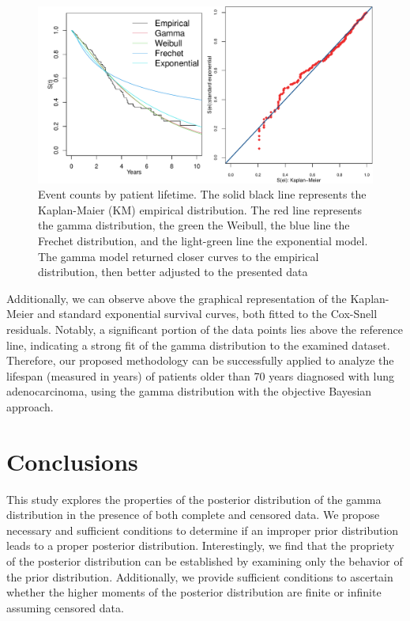 \documentclass[]{interact}
\theoremstyle{plain}%
\theoremstyle{definition}
\theoremstyle{remark}
\begin{document}
\begin{figure}[!h] 
	\centering
	\includegraphics[scale=0.50]{survival.pdf}
	\caption{Event counts by patient lifetime. The solid
black line represents the Kaplan-Maier (KM) empirical distribution. The red line
represents the gamma distribution, the green the Weibull, the blue line the Frechet distribution, and the light-green line the exponential model. The
gamma model returned closer curves to the empirical distribution, then better adjusted to the
presented data}\label{grafico-obscajust1}
\end{figure}

Additionally, we can observe above the graphical representation of the Kaplan-Meier and standard exponential survival curves, both fitted to the Cox-Snell residuals. Notably, a significant portion of the data points lies above the reference line, indicating a strong fit of the gamma distribution to the examined dataset. Therefore, our proposed methodology can be successfully applied to analyze the lifespan (measured in years) of patients older than 70 years diagnosed with lung adenocarcinoma, using the gamma distribution with the objective Bayesian approach.

\section{Conclusions}\label{sec:6}

This study explores the properties of the posterior distribution of the gamma distribution in the presence of both complete and censored data. We propose necessary and sufficient conditions to determine if an improper prior distribution leads to a proper posterior distribution. Interestingly, we find that the propriety of the posterior distribution can be established by examining only the behavior of the prior distribution. Additionally, we provide sufficient conditions to ascertain whether the higher moments of the posterior distribution are finite or infinite assuming censored data.
\end{document}
